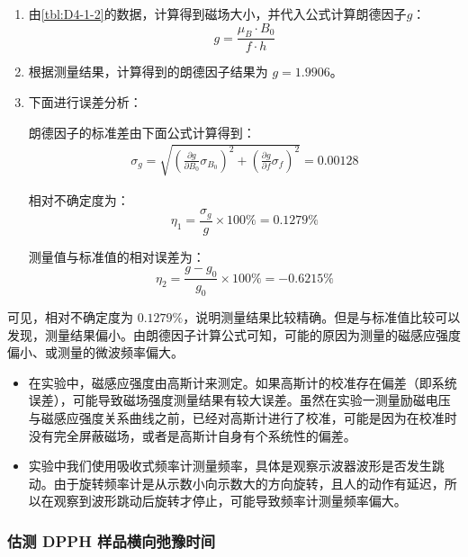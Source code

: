 \documentclass[dvipsnames, svgnames,a4paper,11pt]{article}
\begin{document}
		\begin{enumerate}
			\item 由\cref{tbl:D4-1-2}的数据，计算得到磁场大小，并代入公式计算朗德因子$g$：
				\[
					g = \frac{\mu_B \cdot B_0}{f \cdot h}
				\]

			\item 根据测量结果，计算得到的朗德因子结果为 $g = 1.9906$。
			
			\item 下面进行误差分析：
			
				朗德因子的标准差由下面公式计算得到：
				\begin{align*}
					\sigma_g = \sqrt{(\frac{\partial g}{\partial B_0} \sigma_{B_0})^2 + (\frac{\partial g}{\partial f} \sigma_f)^2} = 0.00128
				\end{align*}
				
				相对不确定度为：
				\[
					\eta_1 = \frac{\sigma_g}{g} \times 100 \% = 0.1279 \%
				\]

				测量值与标准值的相对误差为：
				\[
					\eta_2 = \frac{g - g_0}{g_0} \times 100 \% = -0.6215 \%
				\]
			
		\end{enumerate}

		可见，相对不确定度为 $0.1279 \%$，说明测量结果比较精确。但是与标准值比较可以发现，测量结果偏小。由朗德因子计算公式可知，可能的原因为测量的磁感应强度偏小、或测量的微波频率偏大。

		\begin{itemize}
			\item 在实验中，磁感应强度由高斯计来测定。如果高斯计的校准存在偏差（即系统误差），可能导致磁场强度测量结果有较大误差。虽然在实验一测量励磁电压与磁感应强度关系曲线之前，已经对高斯计进行了校准，可能是因为在校准时没有完全屏蔽磁场，或者是高斯计自身有个系统性的偏差。
			\item 实验中我们使用吸收式频率计测量频率，具体是观察示波器波形是否发生跳动。由于旋转频率计是从示数小向示数大的方向旋转，且人的动作有延迟，所以在观察到波形跳动后旋转才停止，可能导致频率计测量频率偏大。
		\end{itemize}







	\subsubsection{估测 DPPH 样品横向弛豫时间}
		
\end{document}
